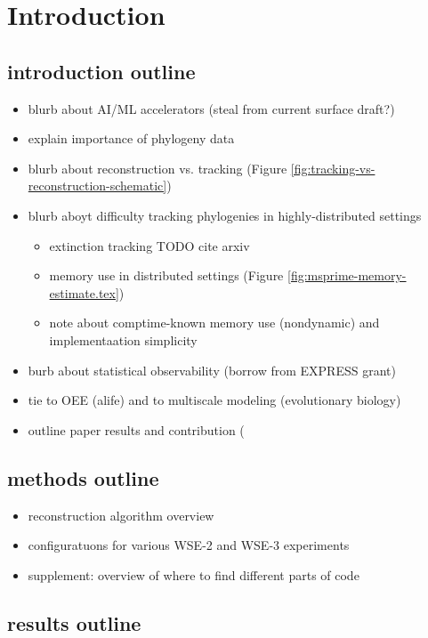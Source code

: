 \section{Introduction} \label{sec:introduction}

\subsection{introduction outline}

\begin{itemize}
\item blurb about AI/ML accelerators (steal from current surface draft?)
\item explain importance of phylogeny data
\item blurb about reconstruction vs. tracking (Figure \ref{fig:tracking-vs-reconstruction-schematic})
\item blurb aboyt difficulty tracking phylogenies in highly-distributed settings
   \begin{itemize}
   \item extinction tracking TODO cite arxiv
   \item memory use in distributed settings (Figure \ref{fig:msprime-memory-estimate.tex})
   \item note about comptime-known memory use (nondynamic) and implementaation simplicity
   \end{itemize}
\item burb about statistical observability (borrow from EXPRESS grant)
\item tie to OEE (alife) and to multiscale modeling (evolutionary biology)
\item outline paper results and contribution (
\end{itemize}

\subsection{methods outline}

\begin{itemize}
\item reconstruction algorithm overview
\item configuratuons for various WSE-2 and WSE-3 experiments
\item supplement: overview of where to find different parts of code
\end{itemize}

\subsection{results outline}

